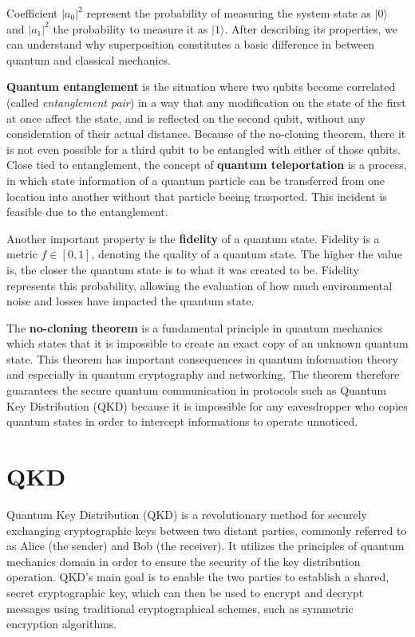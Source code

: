 \documentclass[12pt,a4paper] {report}
\begin{document}
		Coefficient $|a_0|^2$ represent the probability of measuring the system state as $|0\rangle$ and $|a_1|^2$ the probability to measure it
		as $|1\rangle$. After describing its properties, we can understand why superposition constitutes a 
		basic difference in between quantum and classical mechanics. 

		\textbf{Quantum entanglement} is the situation where two qubits become correlated
		(called \textit{entanglement pair}) in a way that
		any modification on the state of the first at once affect the state, and is reflected on the second qubit, 
		without any consideration of their actual distance. Because of the no-cloning theorem, there it is not even
		possible for a third qubit to be entangled with either of those qubits. Close tied to entanglement, the concept
		of \textbf{quantum teleportation} is a process, in which state information of a quantum particle can be transferred
		from one location into another without that particle beeing trasported.
		This incident is feasible due to the entanglement.
		
		Another important property is the \textbf{fidelity} of a quantum state.
		Fidelity is a metric  \( \textit{f} \in [0,1] \), denoting the quality of a quantum state.
		The higher the value is, the closer the quantum state is to what it was created to be.
		Fidelity represents this probability, allowing the evaluation of how much environmental noise
		and losses have impacted the quantum state.

		The \textbf{no-cloning theorem} is a fundamental principle in quantum mechanics 
		which states that it is impossible to create an exact copy of an unknown quantum state. 
		This theorem has important consequences in quantum information theory and especially in
		quantum cryptography and networking. The theorem therefore guarantees the secure quantum communication 
		in protocols such as Quantum Key Distribution (QKD) because it is impossible for any eavesdropper who copies
		quantum states in order to intercept informations to operate unnoticed.

		\section{QKD}


		Quantum Key Distribution (QKD) is a revolutionary method for securely exchanging cryptographic keys between two distant parties\cite{powergrid}, 
		commonly referred to as Alice (the sender) and Bob (the receiver). 
		It utilizes the principles of quantum mechanics domain in order to ensure the security of the key distribution operation. 
		QKD's main goal is to enable the two parties to establish a shared, secret cryptographic key, 
		which can then be used to encrypt and decrypt messages using traditional cryptographical schemes, such as symmetric encryption algorithms.
\end{document}
